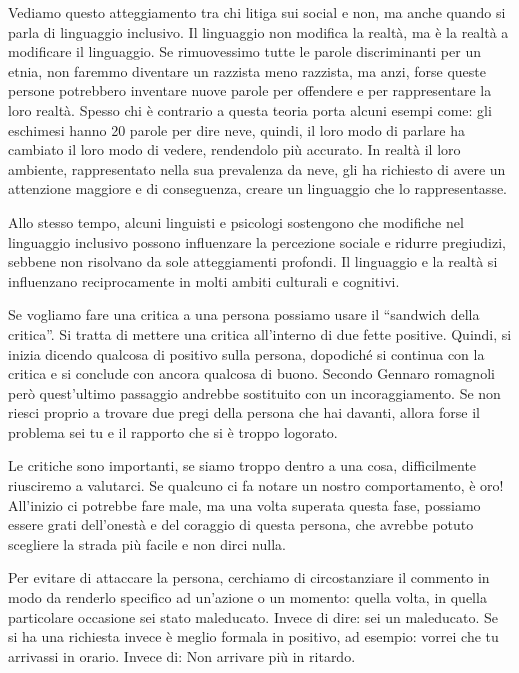 \documentclass[12pt]{book} %
\begin{document}
Vediamo questo atteggiamento tra chi litiga sui social e non, ma anche quando si parla di linguaggio inclusivo. Il
linguaggio non modifica la realtà, ma è la realtà a modificare il linguaggio. Se rimuovessimo tutte le parole
discriminanti per un etnia, non faremmo diventare un razzista meno razzista, ma anzi, forse queste persone
potrebbero inventare nuove parole per offendere e per rappresentare la loro realtà.
Spesso chi è contrario a questa teoria porta alcuni esempi come: gli eschimesi hanno 20 parole per dire neve, quindi, il loro modo di parlare ha cambiato il loro modo di vedere, rendendolo più accurato. In realtà il loro ambiente, rappresentato nella sua prevalenza da neve, gli ha richiesto di avere un attenzione maggiore e di conseguenza, creare un linguaggio che lo rappresentasse.

Allo stesso tempo, alcuni linguisti e psicologi sostengono che modifiche nel linguaggio inclusivo possono influenzare la percezione sociale e ridurre pregiudizi, sebbene non risolvano da sole atteggiamenti profondi. Il linguaggio e la realtà si influenzano reciprocamente in molti ambiti culturali e cognitivi.

Se vogliamo fare una critica a una persona possiamo usare il “sandwich della critica”. Si tratta di mettere una critica
all'interno di due fette positive. Quindi, si inizia dicendo qualcosa di positivo sulla persona, dopodiché si continua con la critica e si conclude con ancora qualcosa di buono.
Secondo Gennaro romagnoli però quest'ultimo passaggio andrebbe sostituito con un incoraggiamento. Se non riesci proprio a trovare
due pregi della persona che hai davanti, allora forse il problema sei tu e il rapporto che si è troppo logorato.

Le critiche sono importanti, se siamo troppo dentro a una cosa, difficilmente riusciremo a valutarci. 
Se qualcuno ci fa notare un nostro comportamento, è oro!
All'inizio ci potrebbe fare male, ma una
volta superata questa fase, possiamo essere grati dell'onestà e del coraggio di questa persona, che avrebbe potuto scegliere la strada più facile e non dirci nulla. 

Per evitare di attaccare la persona, cerchiamo di circostanziare il commento in modo da renderlo specifico ad un'azione o un momento: quella volta, in quella particolare occasione sei stato maleducato. Invece di dire: sei un maleducato. Se
si ha una richiesta invece è meglio formala in positivo, ad esempio: vorrei che tu arrivassi in orario. Invece di: Non
arrivare più in ritardo.
\end{document}
